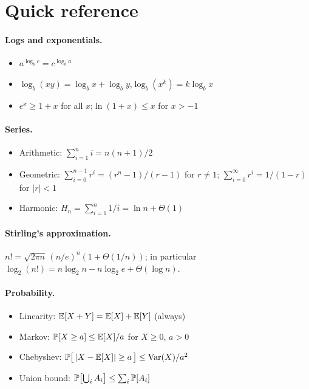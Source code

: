 \section*{Quick reference}
\label{sec:quickref}

\paragraph{Logs and exponentials.}
\begin{itemize}
  \item $a^{\log_b c} = c^{\log_b a}$
  \item $\log_b(xy) = \log_b x + \log_b y$,\quad $\log_b(x^k) = k \log_b x$
  \item $e^x \ge 1 + x$ for all $x$;\quad $\ln(1 + x) \le x$ for $x > -1$
\end{itemize}

\paragraph{Series.}
\begin{itemize}
  \item Arithmetic: $\sum_{i=1}^n i = n(n+1)/2$
  \item Geometric: $\sum_{i=0}^{n-1} r^i = (r^n - 1)/(r - 1)$ for $r \ne 1$;\quad
        $\sum_{i=0}^\infty r^i = 1/(1 - r)$ for $|r| < 1$
  \item Harmonic: $H_n = \sum_{i=1}^n 1/i = \ln n + \Theta(1)$
\end{itemize}

\paragraph{Stirling's approximation.}
$n! = \sqrt{2\pi n}\, (n/e)^n (1 + \Theta(1/n))$;\quad
in particular $\log_2(n!) = n \log_2 n - n \log_2 e + \Theta(\log n)$.

\paragraph{Probability.}
\begin{itemize}
  \item Linearity: $\operatorname{\mathbb{E}}[X + Y] = \operatorname{\mathbb{E}}[X] + \operatorname{\mathbb{E}}[Y]$ (always)
  \item Markov: $\operatorname{\mathbb{P}}[X \ge a] \le \operatorname{\mathbb{E}}[X]/a$ for $X \ge 0$, $a > 0$
  \item Chebyshev: $\operatorname{\mathbb{P}}\bigl[\,|X - \operatorname{\mathbb{E}}[X]| \ge a\,\bigr] \le \mathrm{Var}(X)/a^2$
  \item Union bound: $\operatorname{\mathbb{P}}\bigl[\bigcup_i A_i\bigr] \le \sum_i \operatorname{\mathbb{P}}[A_i]$
\end{itemize}


